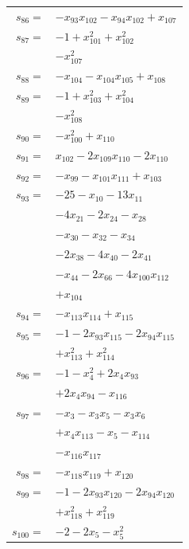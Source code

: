 \begin{longtable}{@{}r@{\;}l@{}}
\(s_{86}=\) & \(\displaystyle -x_{93}x_{102} -x_{94}x_{102} +x_{107}\) \\[3pt]
\(s_{87}=\) & \(\displaystyle -1 +x_{101}^{2} +x_{102}^{2}\) \\
 & \(\displaystyle -x_{107}^{2}\) \\[3pt]
\(s_{88}=\) & \(\displaystyle -x_{104} -x_{104}x_{105} +x_{108}\) \\[3pt]
\(s_{89}=\) & \(\displaystyle -1 +x_{103}^{2} +x_{104}^{2}\) \\
 & \(\displaystyle -x_{108}^{2}\) \\[3pt]
\(s_{90}=\) & \(\displaystyle -x_{100}^{2} +x_{110}\) \\[3pt]
\(s_{91}=\) & \(\displaystyle x_{102} -2x_{109}x_{110} -2x_{110}\) \\[3pt]
\(s_{92}=\) & \(\displaystyle -x_{99} -x_{101}x_{111} +x_{103}\) \\[3pt]
\(s_{93}=\) & \(\displaystyle -25 -x_{10} -13x_{11}\) \\
 & \(\displaystyle -4x_{21} -2x_{24} -x_{28}\) \\
 & \(\displaystyle -x_{30} -x_{32} -x_{34}\) \\
 & \(\displaystyle -2x_{38} -4x_{40} -2x_{41}\) \\
 & \(\displaystyle -x_{44} -2x_{66} -4x_{100}x_{112}\) \\
 & \(\displaystyle +x_{104}\) \\[3pt]
\(s_{94}=\) & \(\displaystyle -x_{113}x_{114} +x_{115}\) \\[3pt]
\(s_{95}=\) & \(\displaystyle -1 -2x_{93}x_{115} -2x_{94}x_{115}\) \\
 & \(\displaystyle +x_{113}^{2} +x_{114}^{2}\) \\[3pt]
\(s_{96}=\) & \(\displaystyle -1 -x_{4}^{2} +2x_{4}x_{93}\) \\
 & \(\displaystyle +2x_{4}x_{94} -x_{116}\) \\[3pt]
\(s_{97}=\) & \(\displaystyle -x_{3} -x_{3}x_{5} -x_{3}x_{6}\) \\
 & \(\displaystyle +x_{4}x_{113} -x_{5} -x_{114}\) \\
 & \(\displaystyle -x_{116}x_{117}\) \\[3pt]
\(s_{98}=\) & \(\displaystyle -x_{118}x_{119} +x_{120}\) \\[3pt]
\(s_{99}=\) & \(\displaystyle -1 -2x_{93}x_{120} -2x_{94}x_{120}\) \\
 & \(\displaystyle +x_{118}^{2} +x_{119}^{2}\) \\[3pt]
\(s_{100}=\) & \(\displaystyle -2 -2x_{5} -x_{5}^{2}\) \\

\end{longtable}
